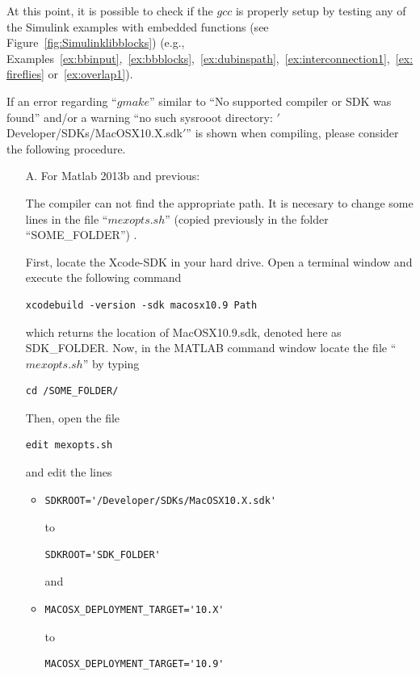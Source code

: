 \documentclass{article}
\begin{document}
At this point, it is possible to check if the $gcc$ is properly setup by testing any of the Simulink examples with embedded functions (see Figure~\ref{fig:Simulinklibblocks}) (e.g., Examples~\ref{ex:bbinput},~\ref{ex:bbblocks},~\ref{ex:dubinspath},~\ref{ex:interconnection1},~\ref{ex:fireflies} or~\ref{ex:overlap1}).

If an error regarding ``$gmake$'' similar to ``No supported compiler or SDK was found'' and/or a warning ``no such sysrooot directory: $'$Developer/SDKs/MacOSX10.X.sdk$'$'' is shown when compiling, please consider the following procedure.

\begin{itemize}
\item[A.] For Matlab 2013b and previous:

The compiler can not find the appropriate path. It is necesary to change some lines in the file ``$mexopts.sh$'' (copied previously in the folder ``SOME\_FOLDER'') .

First, locate the Xcode-SDK in your hard drive. Open a terminal window and execute the following command
\begin{verbatim}
xcodebuild -version -sdk macosx10.9 Path
\end{verbatim}
which returns the location of MacOSX10.9.sdk, denoted here as SDK\_FOLDER. Now, in the MATLAB command window locate the file ``$mexopts.sh$'' by typing 
\begin{verbatim}
cd /SOME_FOLDER/
\end{verbatim}
Then, open the file 
\begin{verbatim}
edit mexopts.sh
\end{verbatim}
and edit the lines
\begin{itemize}
\item
\begin{verbatim}
SDKROOT='/Developer/SDKs/MacOSX10.X.sdk'
\end{verbatim}
to 
\begin{verbatim}
SDKROOT='SDK_FOLDER'
\end{verbatim}
and
\item
\begin{verbatim}
MACOSX_DEPLOYMENT_TARGET='10.X'
\end{verbatim}
to 
\begin{verbatim}
MACOSX_DEPLOYMENT_TARGET='10.9'
\end{verbatim}
\end{itemize}


\end{itemize}
\end{document}
